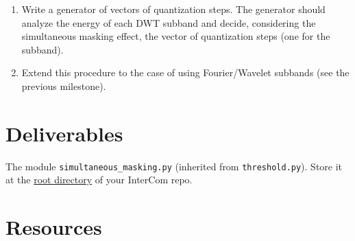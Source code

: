 \begin{enumerate}
\item Write a generator of vectors of quantization steps. The
  generator should analyze the energy of each DWT subband and decide,
  considering the simultaneous masking effect, the vector of
  quantization steps (one for the subband).
\item Extend this procedure to the case of using Fourier/Wavelet
  subbands (see the previous milestone).
\end{enumerate}

\section{Deliverables}

The module \verb|simultaneous_masking.py| (inherited from
\verb|threshold.py|). Store it at the
\href{https://github.com/Tecnologias-multimedia/intercom}{root
  directory} of your InterCom repo.

\section{Resources}



